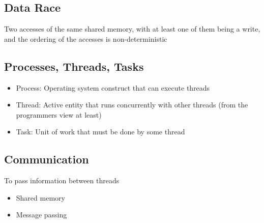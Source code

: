 \documentclass{article}
\begin{document}
\subsection{Data Race}
Two accesses of the same shared memory, with at least one of them being a write, and the ordering of the accesses is non-deterministic

\subsection{Processes, Threads, Tasks}
\begin{itemize}
  \item Process: Operating system construct that can execute threads
  \item Thread: Active entity that runs concurrently with other threads (from the programmers view at least)
  \item Task: Unit of work that must be done by some thread 
\end{itemize}
\subsection{Communication}
To pass information between threads
\begin{itemize}
  \item Shared memory
  \item Message passing
\end{itemize}
\end{document}
